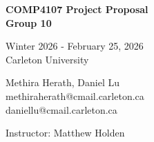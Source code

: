\pagestyle{empty}

\begin{titlepage}
        \begin{center}
        \vspace*{3.0cm}

        \Huge
        {\bf COMP4107 Project Proposal \\ Group 10 }

        \vspace*{1.0cm}

        \normalsize
        Winter 2026 - February 25, 2026\\
        Carleton University \\

        \vspace*{1.0cm}

        Methira Herath, Daniel Lu \\

        \normalsize
        methiraherath@cmail.carleton.ca \\
        daniellu@cmail.carleton.ca \\

        \vspace*{1.0cm}

        \normalsize
        Instructor: Matthew Holden \\

        \end{center}
\end{titlepage}

\pagestyle{plain}
\setcounter{page}{2}

\cleardoublepage %


